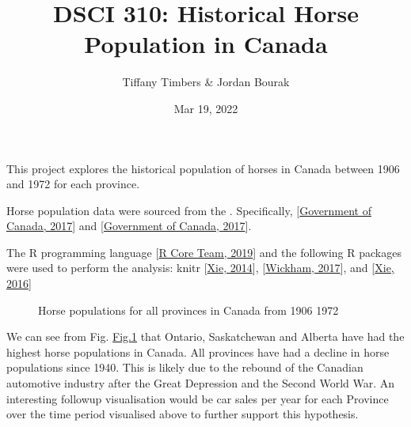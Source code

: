 \documentclass[letterpaper,10pt,english]{jupyterBook}
\title{DSCI 310: Historical Horse Population in Canada}
\date{Mar 19, 2022}
\author{Tiffany Timbers \& Jordan Bourak}
\begin{document}
\pagestyle{empty}
\sphinxmaketitle
\pagestyle{plain}
\sphinxtableofcontents
\pagestyle{normal}
\label{\detokenize{jbook_example::doc}}


\sphinxAtStartPar
This project explores the historical population of horses in Canada
between 1906 and 1972 for each province.

\begin{DUlineblock}{0em}
\item[] 
\end{DUlineblock}

\sphinxAtStartPar
Horse population data were sourced from the .
Specifically, {[}\hyperlink{cite.jbook_example:id14}{Government of Canada, 2017}{]} and {[}\hyperlink{cite.jbook_example:id15}{Government of Canada, 2017}{]}.

\begin{DUlineblock}{0em}
\item[] 
\end{DUlineblock}

\sphinxAtStartPar
The R programming language {[}\hyperlink{cite.jbook_example:id9}{R Core Team, 2019}{]} and the following R packages were used
to perform the analysis: knitr {[}\hyperlink{cite.jbook_example:id13}{Xie, 2014}{]}, {[}\hyperlink{cite.jbook_example:id12}{Wickham, 2017}{]}, and
{[}\hyperlink{cite.jbook_example:id11}{Xie, 2016}{]}

\begin{DUlineblock}{0em}
\item[] 
\end{DUlineblock}

\begin{figure}[htbp]
\centering
\capstart

\noindent{}
\caption{Horse populations for all provinces in Canada from 1906 \sphinxhyphen{} 1972}\label{\detokenize{jbook_example:horse-pop-plt}}\end{figure}

\sphinxAtStartPar
We can see from Fig. \hyperref[\detokenize{jbook_example:horse-pop-plt}]{Fig.\@ \ref{\detokenize{jbook_example:horse-pop-plt}}}
that Ontario, Saskatchewan and Alberta have had the highest horse populations in Canada.
All provinces have had a decline in horse populations since 1940.
This is likely due to the rebound of the Canadian automotive
industry after the Great Depression and the Second World War.
An interesting follow\sphinxhyphen{}up visualisation would be car sales per year for each
Province over the time period visualised above to further support this hypothesis.
\end{document}
